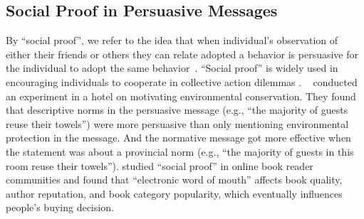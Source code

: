 \subsection{Social Proof in Persuasive Messages }
By ``social proof'', we refer to the idea that when individual's observation of either their friends or others they can relate adopted a behavior is persuasive for the individual to adopt the same behavior~\cite{Cialdini1993, Cialdini2004}. ``Social proof'' is widely used in encouraging individuals to cooperate in collective action dilemmas \cite{goldstein2008room,schultz2007constructive}. ~\textcite{goldstein2008room} conducted an experiment in a hotel on motivating environmental conservation. They found that descriptive norms in the persuasive message (e.g., ``the majority of guests reuse their towels'') were more persuasive than only mentioning environmental protection in the message. And the normative message got more effective when the statement was about a provincial norm (e.g., ``the majority of guests in this room reuse their towels''). \textcite{amblee2011harnessing} studied ``social proof'' in online book reader communities and found that ``electronic word of mouth'' affects book quality, author  reputation, and book category popularity, which eventually influences people's buying decision. 